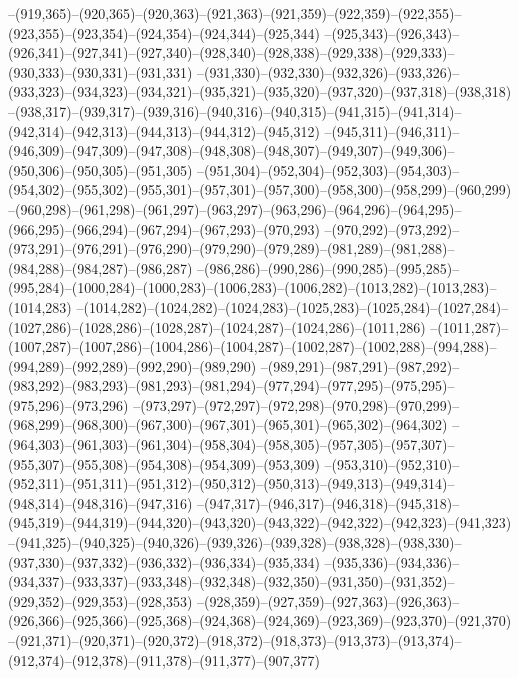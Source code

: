 --(919,365)--(920,365)--(920,363)--(921,363)--(921,359)--(922,359)--(922,355)--(923,355)--(923,354)--(924,354)--(924,344)--(925,344)
--(925,343)--(926,343)--(926,341)--(927,341)--(927,340)--(928,340)--(928,338)--(929,338)--(929,333)--(930,333)--(930,331)--(931,331)
--(931,330)--(932,330)--(932,326)--(933,326)--(933,323)--(934,323)--(934,321)--(935,321)--(935,320)--(937,320)--(937,318)--(938,318)
--(938,317)--(939,317)--(939,316)--(940,316)--(940,315)--(941,315)--(941,314)--(942,314)--(942,313)--(944,313)--(944,312)--(945,312)
--(945,311)--(946,311)--(946,309)--(947,309)--(947,308)--(948,308)--(948,307)--(949,307)--(949,306)--(950,306)--(950,305)--(951,305)
--(951,304)--(952,304)--(952,303)--(954,303)--(954,302)--(955,302)--(955,301)--(957,301)--(957,300)--(958,300)--(958,299)--(960,299)
--(960,298)--(961,298)--(961,297)--(963,297)--(963,296)--(964,296)--(964,295)--(966,295)--(966,294)--(967,294)--(967,293)--(970,293)
--(970,292)--(973,292)--(973,291)--(976,291)--(976,290)--(979,290)--(979,289)--(981,289)--(981,288)--(984,288)--(984,287)--(986,287)
--(986,286)--(990,286)--(990,285)--(995,285)--(995,284)--(1000,284)--(1000,283)--(1006,283)--(1006,282)--(1013,282)--(1013,283)--(1014,283)
--(1014,282)--(1024,282)--(1024,283)--(1025,283)--(1025,284)--(1027,284)--(1027,286)--(1028,286)--(1028,287)--(1024,287)--(1024,286)--(1011,286)
--(1011,287)--(1007,287)--(1007,286)--(1004,286)--(1004,287)--(1002,287)--(1002,288)--(994,288)--(994,289)--(992,289)--(992,290)--(989,290)
--(989,291)--(987,291)--(987,292)--(983,292)--(983,293)--(981,293)--(981,294)--(977,294)--(977,295)--(975,295)--(975,296)--(973,296)
--(973,297)--(972,297)--(972,298)--(970,298)--(970,299)--(968,299)--(968,300)--(967,300)--(967,301)--(965,301)--(965,302)--(964,302)
--(964,303)--(961,303)--(961,304)--(958,304)--(958,305)--(957,305)--(957,307)--(955,307)--(955,308)--(954,308)--(954,309)--(953,309)
--(953,310)--(952,310)--(952,311)--(951,311)--(951,312)--(950,312)--(950,313)--(949,313)--(949,314)--(948,314)--(948,316)--(947,316)
--(947,317)--(946,317)--(946,318)--(945,318)--(945,319)--(944,319)--(944,320)--(943,320)--(943,322)--(942,322)--(942,323)--(941,323)
--(941,325)--(940,325)--(940,326)--(939,326)--(939,328)--(938,328)--(938,330)--(937,330)--(937,332)--(936,332)--(936,334)--(935,334)
--(935,336)--(934,336)--(934,337)--(933,337)--(933,348)--(932,348)--(932,350)--(931,350)--(931,352)--(929,352)--(929,353)--(928,353)
--(928,359)--(927,359)--(927,363)--(926,363)--(926,366)--(925,366)--(925,368)--(924,368)--(924,369)--(923,369)--(923,370)--(921,370)
--(921,371)--(920,371)--(920,372)--(918,372)--(918,373)--(913,373)--(913,374)--(912,374)--(912,378)--(911,378)--(911,377)--(907,377)

